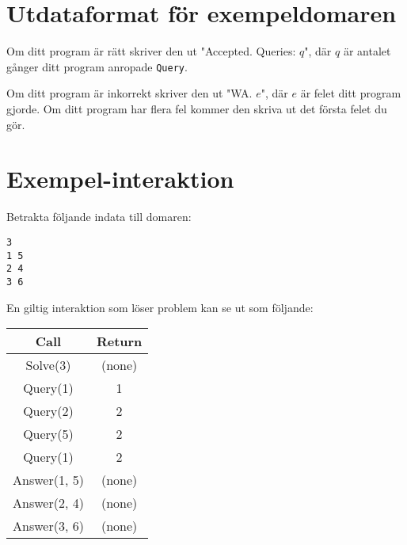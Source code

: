 \section*{Utdataformat för exempeldomaren}
Om ditt program är rätt skriver den ut "Accepted. Queries: $q$", där $q$ är antalet gånger ditt program anropade \texttt{Query}.

Om ditt program är inkorrekt skriver den ut "WA. $e$", där $e$ är felet ditt program gjorde. Om ditt program har flera
fel kommer den skriva ut det första felet du gör.

\section*{Exempel-interaktion}

Betrakta följande indata till domaren:
\begin{verbatim}
3
1 5
2 4
3 6
\end{verbatim}

En giltig interaktion som löser problem kan se ut som följande:

\begin{table}[htbp]
  \centering
  \begin{tabular}{|c|c|}
      \hline
      \textbf{Call} & \textbf{Return} \\
      \hline
      Solve(3) & (none) \\
      \hline
      Query(1) & 1 \\
      \hline
      Query(2) & 2 \\
      \hline
      Query(5) & 2 \\
      \hline
      Query(1) & 2 \\
      \hline
      Answer(1, 5) & (none) \\
      \hline
      Answer(2, 4) & (none) \\
      \hline
      Answer(3, 6) & (none) \\
      \hline
  \end{tabular}
\end{table}


